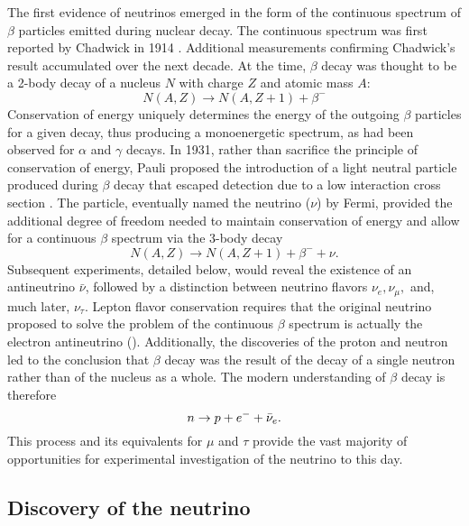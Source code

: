The first evidence of neutrinos emerged in the form of
the continuous spectrum of $\beta$ particles
emitted during nuclear decay.
The continuous spectrum was first reported by Chadwick in 1914 \cite{chadwick_beta}.
Additional measurements confirming Chadwick's result accumulated over the next decade.
At the time, $\beta$ decay was thought to be a 2-body decay
of a nucleus $N$ with charge $Z$ and atomic mass $A$:
\begin{equation}\label{eq:old_beta}
    N(A, Z) \to N(A, Z+1) + \beta^-
\end{equation}
Conservation of energy uniquely determines the energy
of the outgoing $\beta$ particles for a given decay,
thus producing a monoenergetic spectrum,
as had been observed for $\alpha$ and $\gamma$ decays.
In 1931, rather than sacrifice the principle of conservation of energy,
Pauli proposed the introduction of a light neutral particle
produced during $\beta$ decay that escaped detection
due to a low interaction cross section \cite{pauli_letter}.
The particle, eventually named the neutrino ($\nu$) by Fermi,
provided the additional degree of freedom needed
to maintain conservation of energy and allow for a continuous $\beta$ spectrum
via the 3-body decay
\begin{equation}\label{eq:beta_mid}
    N(A, Z) \to N(A, Z+1) + \beta^- + \nu.
\end{equation}
Subsequent experiments, detailed below,
would reveal the existence of an antineutrino $\bar{\nu}$,
followed by a distinction between neutrino flavors $\nu_e, \nu_\mu,$
and, much later, $\nu_\tau$.
Lepton flavor conservation requires that
the original neutrino proposed to solve
the problem of the continuous $\beta$ spectrum
is actually the electron antineutrino (\nuebar).
Additionally, the discoveries of the proton and neutron
led to the conclusion that $\beta$ decay was the result of
the decay of a single neutron rather than of the nucleus as a whole.
The modern understanding of $\beta$ decay is therefore
\begin{equation}\label{eq:beta_modern}
    n \to p + e^- + \bar{\nu}_e.
\end{equation}
This process and its equivalents for $\mu$ and $\tau$
provide the vast majority of opportunities for
experimental investigation of the neutrino to this day.

\subsection{Discovery of the neutrino}
\label{subsec:discovery}

